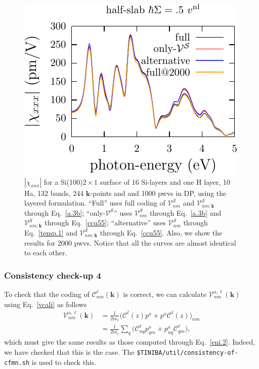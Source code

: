 \begin{figure}[b]
\centering 
\includegraphics[scale=1.5]{content/figures/appendices/shg-si-2x1-16-compa}
\caption{$|\chi_{xxx}|$ for a Si(100)$2\times 1$ surface of 16 Si-layers and one
H layer, 10 Ha, 132 bands, 244 $\mathbf{k}$-points and and 1000 pwvs in DP,
using the layered formulation. ``Full'' uses full coding of
$\mathcal{V}^\mathcal{S}_{nm}$ and $\mathcal{V}^\mathcal{S}_{nm:\mathbf{k}}$
through Eq.~\eqref{a.3b}; ``only-$\mathcal{V}^\mathcal{S}$'' uses
$\mathcal{V}^\mathcal{S}_{nm}$ through Eq.~\eqref{a.3b} and
$\mathcal{V}^\mathcal{S}_{nm:\mathbf{k}}$ through Eq.~\eqref{ccu55};
``alternative'' uses $\mathcal{V}^\mathcal{S}_{nm}$ through Eq.~\eqref{temp.1}
and $\mathcal{V}^\mathcal{S}_{nm:\mathbf{k}}$ through Eq.~\eqref{ccu55}. Also,
we show the results for 2000 pwvs. Notice that all the curves are almost
identical to each other. }
\label{si-2x1-compa}
\end{figure}

\subsubsection{Consistency check-up 4}\label{ccu4}

To check that the coding of $\mathcal{C}^\ell_{nm}(\mathbf{k})$ is correct, we
can calculate $\mathcal{V}^{\mathrm{a},\ell}_{nm}(\mathbf{k})$ using
Eq.~\eqref{vcali} as follows
\begin{align}\label{ccu.1}
\mathcal{V}^{\mathrm{a},\ell}_{nm}(\mathbf{k})
&=
\frac{1}{2m_e}
\Big(
\mathcal{C}^\ell(z)p^\mathrm{a}
+
p^\mathrm{a}\mathcal{C}^\ell(z)
\Big)_{nm}
\nonumber\\
&=
\frac{1}{2m_e}
\sum_q
\Big(
\mathcal{C}^\ell_{nq}p^\mathrm{a}_{qm}
+
p^\mathrm{a}_{nq}\mathcal{C}^\ell_{qm}
\Big)
,
\end{align}
which must give the same results as those computed through
Eq.~\eqref{eni.2}.
Indeed, we have checked that this is the case. The
\verb=$TINIBA/util/consistency-of-cfmn.sh=
is used to check this.

